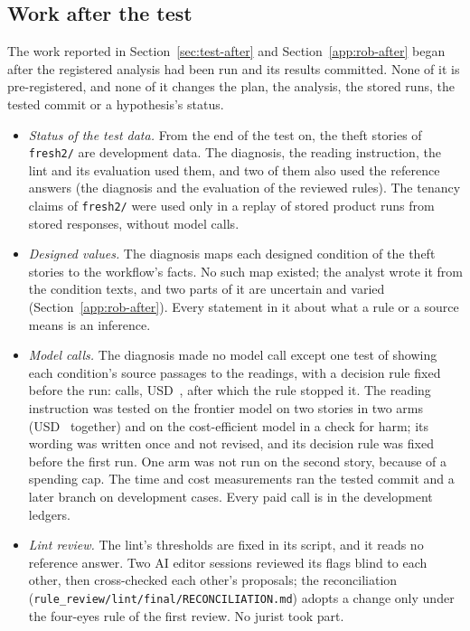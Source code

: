 \subsection{Work after the test}
\label{app:dev-after}
The work reported in Section~\ref{sec:test-after} and Section~\ref{app:rob-after} began after the registered analysis had been run and its results committed. None of it is pre-registered, and none of it changes the plan, the analysis, the stored runs, the tested commit or a hypothesis's status.
\begin{itemize}[leftmargin=1.2em,itemsep=1pt]
\item \emph{Status of the test data.} From the end of the test on, the theft stories of \texttt{fresh2/} are development data. The diagnosis, the reading instruction, the lint and its evaluation used them, and two of them also used the reference answers (the diagnosis and the evaluation of the reviewed rules). The tenancy claims of \texttt{fresh2/} were used only in a replay of stored product runs from stored responses, without model calls.
\item \emph{Designed values.} The diagnosis maps each designed condition of the theft stories to the workflow's facts. No such map existed; the analyst wrote it from the condition texts, and two parts of it are uncertain and varied (Section~\ref{app:rob-after}). Every statement in it about what a rule or a source means is an inference.
\item \emph{Model calls.} The diagnosis made no model call except one test of showing each condition's source passages to the readings, with a decision rule fixed before the run: \fuPassagesCalls{} calls, USD~\fuPassagesUSD, after which the rule stopped it. The reading instruction was tested on the frontier model on two stories in two arms (USD~\fuCaseTypeUSD{} together) and on the cost-efficient model in a check for harm; its wording was written once and not revised, and its decision rule was fixed before the first run. One arm was not run on the second story, because of a spending cap. The time and cost measurements ran the tested commit and a later branch on development cases. Every paid call is in the development ledgers.
\item \emph{Lint review.} The lint's thresholds are fixed in its script, and it reads no reference answer. Two AI editor sessions reviewed its flags blind to each other, then cross-checked each other's proposals; the reconciliation (\texttt{rule\_review/\allowbreak{}lint/\allowbreak{}final/\allowbreak{}RECONCILIATION.md}) adopts a change only under the four-eyes rule of the first review. No jurist took part.

\end{itemize}
